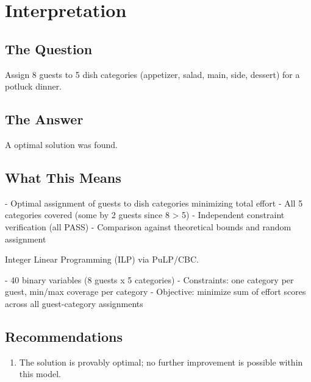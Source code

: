 \documentclass[11pt, a4paper]{article}
\begin{document}
\section{Interpretation}

\subsection{The Question}
Assign 8 guests to 5 dish categories (appetizer, salad, main, side, dessert) for a potluck dinner.

\subsection{The Answer}

\begin{polyainsight}[title={Bottom Line}]
A optimal solution was found.
\end{polyainsight}

\subsection{What This Means}

- Optimal assignment of guests to dish categories minimizing total effort
- All 5 categories covered (some by 2 guests since 8 > 5)
- Independent constraint verification (all PASS)
- Comparison against theoretical bounds and random assignment

Integer Linear Programming (ILP) via PuLP/CBC.

- 40 binary variables (8 guests x 5 categories)
- Constraints: one category per guest, min/max coverage per category
- Objective: minimize sum of effort scores across all guest-category assignments



\subsection{Recommendations}

\begin{enumerate}
  \item The solution is provably optimal; no further improvement is possible within this model.
\end{enumerate}
\end{document}
